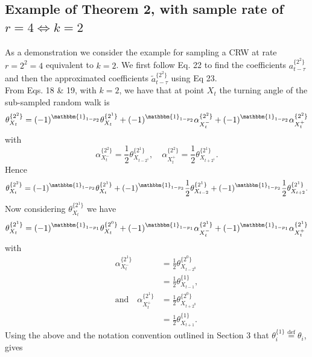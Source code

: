 \documentclass[english]{article}
\begin{document}
\begin{appendices}
\newpage

\section{Example of Theorem 2, with sample rate of $r=4 \Leftrightarrow k=2$}
As a demonstration we consider the example for sampling a CRW at rate $r=2^2=4$ equivalent to $k=2$.  We first follow Eq. 22 to find the coefficients $a^{\{2^2\}}_{t-\tau}$ and then the approximated coefficients $\tilde{a}^{\{2^2\}}_{t-\tau}$ using Eq 23.\\

From Eqs. 18 \& 19, with $k=2$, we have that at point $X_t$ the turning angle of the sub-sampled random walk is
\begin{equation}
    \theta^{\{2^2\}}_{X_t}=(-1)^{\mathbbm{1}_{1-p_2}}\theta^{\{2^1\}}_{X_t}+(-1)^{\mathbbm{1}_{1-p_2}}\alpha^{\{2^2\}}_{X^-_t}+(-1)^{\mathbbm{1}_{1-p_2}}\alpha^{\{2^2\}}_{X^+_t}
\end{equation}
with
\begin{equation}
    \alpha^{\{2^2\}}_{X^-_t}=\frac{1}{2}\theta^{\{2^1\}}_{X_{t-2^1}},\quad \alpha^{\{2^2\}}_{X^+_t}=\frac{1}{2}\theta^{\{2^1\}}_{X_{t+2^1}}.
\end{equation}
Hence
\begin{equation}
    \theta^{\{2^2\}}_{X_t}=(-1)^{\mathbbm{1}_{1-p_2}}\theta^{\{2^1\}}_{X_t}+(-1)^{\mathbbm{1}_{1-p_2}}\frac{1}{2}\theta^{\{2^1\}}_{X_{t-2}}+(-1)^{\mathbbm{1}_{1-p_2}}\frac{1}{2}\theta^{\{2^1\}}_{X_{t+2}}.
\end{equation}
Now considering $\theta^{\{2^1\}}_{X_t}$ we have
\begin{equation}
    \theta^{\{2^1\}}_{X_{t}}=(-1)^{\mathbbm{1}_{1-p_1}}\theta^{\{2^0\}}_{X_{t}}+(-1)^{\mathbbm{1}_{1-p_1}}\alpha^{\{2^1\}}_{X^-_{t}}+(-1)^{\mathbbm{1}_{1-p_1}}\alpha^{\{2^1\}}_{X^+_{t}}
\end{equation}
with
\begin{align}\nonumber
    \alpha^{\{2^1\}}_{X^-_{t}}&=\frac{1}{2}\theta^{\{2^0\}}_{X_{t-2^0}}\\\nonumber
    &=\frac{1}{2}\theta^{\{1\}}_{X_{t-1}},\\\nonumber
    \text{and}\quad \alpha^{\{2^1\}}_{X^+_{t}}&=\frac{1}{2}\theta^{\{2^0\}}_{X_{t+2^0}}\\\nonumber
    &=\frac{1}{2}\theta^{\{1\}}_{X_{t+1}}.
\end{align}
Using the above and the notation convention outlined in Section 3 that $\theta^{\{1\}}_i\stackrel{\text{def}}{=}\theta_i$, gives

\end{appendices}
\end{document}
